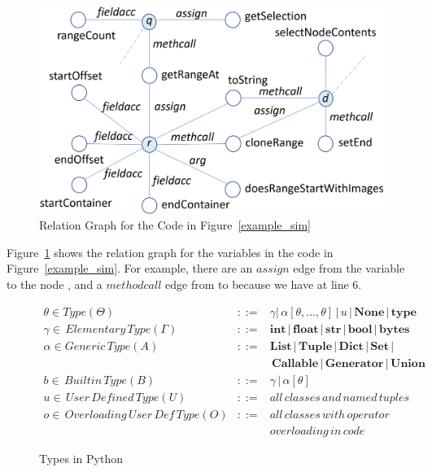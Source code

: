 \begin{figure}[t]
	\begin{center}
	  \includegraphics[width=0.9\columnwidth]{figures/relation-graph}
          \vspace{-6pt}
		\caption{Relation Graph for the Code in Figure~\ref{example_sim}}
		\label{rel-graph}
	\end{center}
\end{figure}

Figure~\ref{rel-graph} shows the relation graph for the variables in
the code in Figure~\ref{example_sim}. For example, there are an
$assign$ edge from the variable  to the node
, and a $methodcall$ edge from  to
 because we have  at line
6.




\begin{figure}[t]
  \small
  \begin{eqnarray*}
    \theta \in Type (\Theta) &::=& \gamma | \, \alpha [\theta, ..., \theta] \, | \, u \, | \, \mathbf{None} \, | \, \mathbf{type}\\
  \gamma \in \, Elementary \, Type (\Gamma) &::=& \mathbf{int} \, | \, \mathbf{float} \, | \, \mathbf{str} \, | \, \mathbf{bool} \, | \, \mathbf{bytes}\\
  \alpha \in Generic \, Type (A) &::=& \mathbf{List} \, | \, \mathbf{Tuple} \, | \, \mathbf{Dict} \, | \, \mathbf{Set} \, |\\
  & & \, \mathbf{Callable} \, | \, \mathbf{Generator} \, | \, \mathbf{Union}\\
  b \in \, Builtin \, Type (B) &::=& \gamma \, | \, \alpha[\theta]\\
  u \in \, User \, Defined \, Type (U) &::=& all \, classes \, and \, named \, tuples\\
  o \in \, Overloading \, User \, Def \, Type (O) &::=& all \, classes \, with \, operator \\
  & & overloading \, in \, code
  \end{eqnarray*}
  \vspace{-18pt}
\caption{Types in Python}
\label{python-types}
\end{figure}

